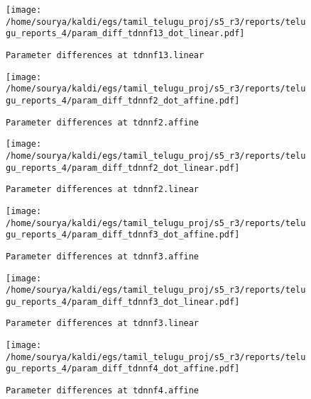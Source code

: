 \documentclass[prl,10pt,twocolumn]{revtex4}
\begin{document}
\newpage
\begin{figure}[h]
  \begin{center}
    \caption{\texttt{Parameter differences at tdnnf13.linear}}
    \texttt{[image: /home/sourya/kaldi/egs/tamil\_telugu\_proj/s5\_r3/reports/telugu\_reports\_4/param\_diff\_tdnnf13\_dot\_linear.pdf]}
  \end{center}
\end{figure}
\clearpage


\newpage
\begin{figure}[h]
  \begin{center}
    \caption{\texttt{Parameter differences at tdnnf2.affine}}
    \texttt{[image: /home/sourya/kaldi/egs/tamil\_telugu\_proj/s5\_r3/reports/telugu\_reports\_4/param\_diff\_tdnnf2\_dot\_affine.pdf]}
  \end{center}
\end{figure}
\clearpage


\newpage
\begin{figure}[h]
  \begin{center}
    \caption{\texttt{Parameter differences at tdnnf2.linear}}
    \texttt{[image: /home/sourya/kaldi/egs/tamil\_telugu\_proj/s5\_r3/reports/telugu\_reports\_4/param\_diff\_tdnnf2\_dot\_linear.pdf]}
  \end{center}
\end{figure}
\clearpage


\newpage
\begin{figure}[h]
  \begin{center}
    \caption{\texttt{Parameter differences at tdnnf3.affine}}
    \texttt{[image: /home/sourya/kaldi/egs/tamil\_telugu\_proj/s5\_r3/reports/telugu\_reports\_4/param\_diff\_tdnnf3\_dot\_affine.pdf]}
  \end{center}
\end{figure}
\clearpage


\newpage
\begin{figure}[h]
  \begin{center}
    \caption{\texttt{Parameter differences at tdnnf3.linear}}
    \texttt{[image: /home/sourya/kaldi/egs/tamil\_telugu\_proj/s5\_r3/reports/telugu\_reports\_4/param\_diff\_tdnnf3\_dot\_linear.pdf]}
  \end{center}
\end{figure}
\clearpage


\newpage
\begin{figure}[h]
  \begin{center}
    \caption{\texttt{Parameter differences at tdnnf4.affine}}
    \texttt{[image: /home/sourya/kaldi/egs/tamil\_telugu\_proj/s5\_r3/reports/telugu\_reports\_4/param\_diff\_tdnnf4\_dot\_affine.pdf]}
  \end{center}
\end{figure}
\clearpage
\end{document}
